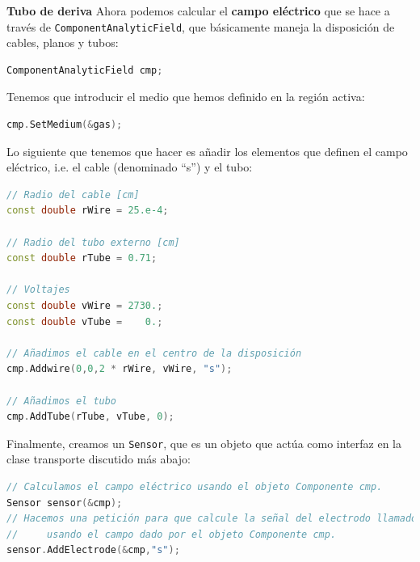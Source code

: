 \begin{Ejemplo}{\textbf{Tubo de deriva}}
Ahora podemos calcular el  \textbf{campo eléctrico} que se hace a través de \texttt{ComponentAnalyticField}, que básicamente maneja la disposición de cables, planos y tubos: \\

\begin{lstlisting}[language=C++,style=c++]
ComponentAnalyticField cmp;
\end{lstlisting} 

\vspace*{1em}

Tenemos que introducir el medio que hemos definido en la región activa: \\

\begin{lstlisting}[language=C++,style=c++]
cmp.SetMedium(&gas);
\end{lstlisting} 

\vspace*{1em}

Lo siguiente que tenemos que hacer es añadir los elementos que definen el campo eléctrico, i.e. el cable (denominado ``s'') y el tubo: \\


\begin{lstlisting}[language=C++,style=c++]
// Radio del cable [cm]
const double rWire = 25.e-4;

// Radio del tubo externo [cm]
const double rTube = 0.71;

// Voltajes 
const double vWire = 2730.;
const double vTube =    0.;

// Añadimos el cable en el centro de la disposición 
cmp.Addwire(0,0,2 * rWire, vWire, "s");

// Añadimos el tubo
cmp.AddTube(rTube, vTube, 0);
\end{lstlisting} 
\vspace*{1em}

Finalmente, creamos un \texttt{Sensor}, que es un objeto que actúa como interfaz en la clase transporte  discutido más abajo: \\


\begin{lstlisting}[language=C++,style=c++]
// Calculamos el campo eléctrico usando el objeto Componente cmp.
Sensor sensor(&cmp);
// Hacemos una petición para que calcule la señal del electrodo llamado s
//     usando el campo dado por el objeto Componente cmp.
sensor.AddElectrode(&cmp,"s");
\end{lstlisting} 
\vspace*{1em}


\end{Ejemplo}
